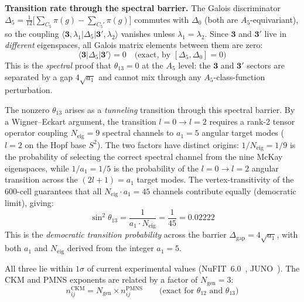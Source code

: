 \documentclass[12pt,a4paper]{article}
\theoremstyle{definition}
\begin{document}
\textbf{Transition rate through the spectral barrier.}
The Galois discriminator $\Delta_5 = \tfrac{1}{12}\bigl[\sum_{C_5}\pi(g) - \sum_{C_5'}\pi(g)\bigr]$ commutes with $\Delta_0$ (both are $A_5$-equivariant), so the coupling $\langle \mathbf{3},\lambda_1 | \Delta_5 | \mathbf{3'},\lambda_2 \rangle$ vanishes unless $\lambda_1 = \lambda_2$.  Since $\mathbf{3}$ and $\mathbf{3'}$ live in \emph{different} eigenspaces, all Galois matrix elements between them are zero:
\begin{equation}
\langle \mathbf{3} | \Delta_5 | \mathbf{3'} \rangle = 0 \quad \text{(exact, by $[\Delta_5, \Delta_0] = 0$)}
\end{equation}
This is the \emph{spectral} proof that $\theta_{13} = 0$ at the $A_5$ level: the $\mathbf{3}$ and $\mathbf{3'}$ sectors are separated by a gap $4\sqrt{a_1}$ and cannot mix through any $A_5$-class-function perturbation.

The nonzero $\theta_{13}$ arises as a \emph{tunneling} transition through this spectral barrier.  By a Wigner--Eckart argument, the transition $l = 0 \to l = 2$ requires a rank-2 tensor operator coupling $N_{\text{eig}} = 9$ spectral channels to $a_1 = 5$ angular target modes ($l = 2$ on the Hopf base $S^2$).  The two factors have distinct origins: $1/N_{\text{eig}} = 1/9$ is the probability of selecting the correct spectral channel from the nine McKay eigenspaces, while $1/a_1 = 1/5$ is the probability of the $l = 0 \to l = 2$ angular transition across the $(2l+1) = a_1$ target modes.  The vertex-transitivity of the 600-cell guarantees that all $N_{\text{eig}} \cdot a_1 = 45$ channels contribute equally (democratic limit), giving:
\begin{equation}
\boxed{\sin^2\theta_{13} = \frac{1}{a_1 \cdot N_{\text{eig}}} = \frac{1}{45} = 0.02222}
\label{eq:theta13}
\end{equation}
This is the \emph{democratic transition probability} across the barrier $\Delta_{\text{gap}} = 4\sqrt{a_1}$, with both $a_1$ and $N_{\text{eig}}$ derived from the integer $a_1 = 5$.

All three lie within $1\sigma$ of current experimental values (NuFIT~6.0~\cite{nufit6}, JUNO~\cite{juno2025}). The CKM and PMNS exponents are related by a factor of $N_{\text{gen}} = 3$:
\begin{equation}
n^{\text{CKM}}_{ij} = N_{\text{gen}} \times n^{\text{PMNS}}_{ij} \qquad \text{(exact for } \theta_{12} \text{ and } \theta_{13}\text{)}
\end{equation}
\end{document}
